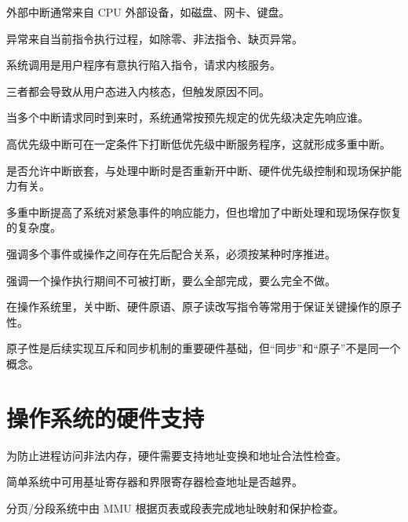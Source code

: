 \begin{points}
  \item 外部中断通常来自 CPU 外部设备，如磁盘、网卡、键盘。
  \item 异常来自当前指令执行过程，如除零、非法指令、缺页异常。
  \item 系统调用是用户程序有意执行陷入指令，请求内核服务。
  \item 三者都会导致从用户态进入内核态，但触发原因不同。
\end{points}


\begin{points}
  \item 当多个中断请求同时到来时，系统通常按预先规定的优先级决定先响应谁。
  \item 高优先级中断可在一定条件下打断低优先级中断服务程序，这就形成多重中断。
  \item 是否允许中断嵌套，与处理中断时是否重新开中断、硬件优先级控制和现场保护能力有关。
  \item 多重中断提高了系统对紧急事件的响应能力，但也增加了中断处理和现场保存恢复的复杂度。
\end{points}


\begin{points}
  \item {}强调多个事件或操作之间存在先后配合关系，必须按某种时序推进。
  \item {}强调一个操作执行期间不可被打断，要么全部完成，要么完全不做。
  \item 在操作系统里，关中断、硬件原语、原子读改写指令等常用于保证关键操作的原子性。
  \item 原子性是后续实现互斥和同步机制的重要硬件基础，但“同步”和“原子”不是同一个概念。
\end{points}


\section{操作系统的硬件支持}
\begin{points}
  \item 为防止进程访问非法内存，硬件需要支持地址变换和地址合法性检查。
  \item 简单系统中可用基址寄存器和界限寄存器检查地址是否越界。
  \item 分页/分段系统中由 MMU 根据页表或段表完成地址映射和保护检查。
\end{points}


